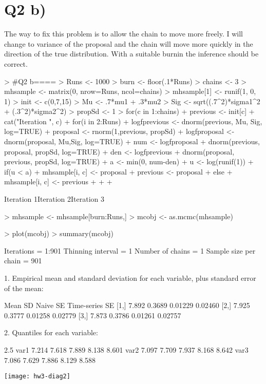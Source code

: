 \documentclass{article}
\begin{document}
\section*{Q2 b)}
The way to fix this problem is to allow the chain to move more freely. I will change to variance of the proposal and the chain will move more quickly in the direction of the true distribution. With a suitable burnin the inference should be correct. 
\begin{Schunk}
\begin{Sinput}
> #Q2 b====
> Runs <- 1000
> burn <- floor(.1*Runs)
> chains <- 3
> mhsample <- matrix(0, nrow=Runs, ncol=chains)
> mhsample[1] <- runif(1, 0, 1)
> init <- c(0,7,15)
> Mu <- .7*mu1 + .3*mu2
> Sig <- sqrt((.7^2)*sigma1^2 + (.3^2)*sigma2^2)
> propSd <- 1
> for(c in 1:chains){
+   previous <- init[c]
+   cat("Iteration ", c)
+   for(i in 2:Runs){
+     logfprevious <- dnorm(previous, Mu, Sig, log=TRUE)
+     proposal <- rnorm(1,previous, propSd)
+     logfproposal <- dnorm(proposal, Mu,Sig, log=TRUE)
+     num <-  logfproposal + dnorm(previous, proposal, propSd, log=TRUE)
+     den <- logfprevious + dnorm(proposal, previous, propSd, log=TRUE)
+     a <- min(0, num-den)
+     u <- log(runif(1))
+     if(u < a){
+       mhsample[i, c] <- proposal  
+       previous <- proposal
+     }else{
+       mhsample[i, c] <- previous
+     }
+   }
+ }
\end{Sinput}
\begin{Soutput}
Iteration  1Iteration  2Iteration  3
\end{Soutput}
\begin{Sinput}
> mhsample <- mhsample[burn:Runs,]
> mcobj <- as.mcmc(mhsample)
\end{Sinput}
\end{Schunk}
\begin{Schunk}
\begin{Sinput}
> plot(mcobj)
> summary(mcobj)
\end{Sinput}
\begin{Soutput}
Iterations = 1:901
Thinning interval = 1 
Number of chains = 1 
Sample size per chain = 901 

1. Empirical mean and standard deviation for each variable,
   plus standard error of the mean:

      Mean     SD Naive SE Time-series SE
[1,] 7.892 0.3689  0.01229        0.02460
[2,] 7.925 0.3777  0.01258        0.02779
[3,] 7.873 0.3786  0.01261        0.02757

2. Quantiles for each variable:

      2.5%   25%   50%   75% 97.5%
var1 7.214 7.618 7.889 8.138 8.601
var2 7.097 7.709 7.937 8.168 8.642
var3 7.086 7.629 7.886 8.129 8.588
\end{Soutput}
\end{Schunk}
\texttt{[image: hw3-diag2]}
\end{document}
